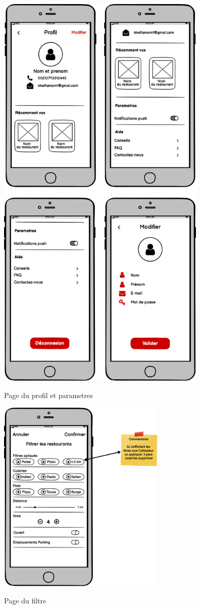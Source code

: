 \newpage
\begin{figure}[!h]
    \centering
    \includegraphics[width=10cm]{images/Chapitre3/maquettes_balsamiq/Profil.png}
    \label{fig:profil}
    \caption{Page du profil et parametres}
\end{figure} 
\newpage
\begin{figure}[!h]
    \centering
    \includegraphics[width=8cm]{images/Chapitre3/maquettes_balsamiq/Filtre.png}
    \label{fig:filtre}
    \caption{Page du filtre}
\end{figure} 

